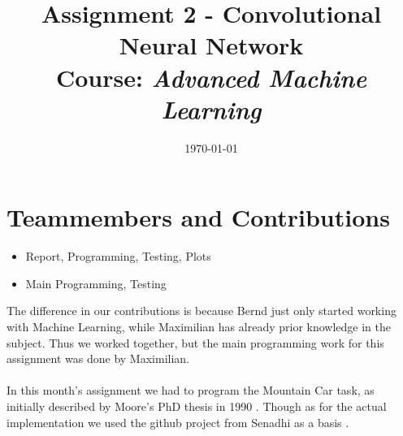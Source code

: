 \documentclass{article}
\title{Assignment 2 - Convolutional Neural Network\\
		{\large Course: \textit{Advanced Machine Learning}}}
\date{\today}
\begin{document}
	
	\maketitle
	
	\section{Teammembers and Contributions}
	\label{sec:TeammembersAndContributions}
	
	\begin{itemize}
		\item {} Report, Programming, Testing, Plots
		\item {} Main Programming, Testing
	\end{itemize}
	
	\noindent The difference in our contributions is because Bernd just only started working with Machine Learning, while Maximilian has already prior knowledge in the subject. Thus we worked together, but the main programming work for this assignment was done by Maximilian. \\
	\\
	In this month's assignment we had to program the Mountain Car task, as initially described by Moore's PhD thesis in 1990 \cite{Moore90efficientmemory-based}. Though as for the actual implementation we used the github project from Senadhi as a basis \cite{MountainCar-v02018}. 
	
	
\end{document}

